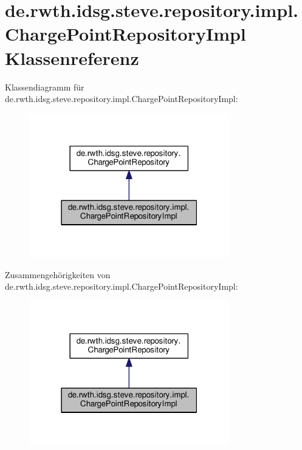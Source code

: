 \hypertarget{classde_1_1rwth_1_1idsg_1_1steve_1_1repository_1_1impl_1_1_charge_point_repository_impl}{\section{de.\+rwth.\+idsg.\+steve.\+repository.\+impl.\+Charge\+Point\+Repository\+Impl Klassenreferenz}
\label{classde_1_1rwth_1_1idsg_1_1steve_1_1repository_1_1impl_1_1_charge_point_repository_impl}
}


Klassendiagramm für de.\+rwth.\+idsg.\+steve.\+repository.\+impl.\+Charge\+Point\+Repository\+Impl\+:\nopagebreak
\begin{figure}[H]
\begin{center}
\leavevmode
\includegraphics[width=247pt]{classde_1_1rwth_1_1idsg_1_1steve_1_1repository_1_1impl_1_1_charge_point_repository_impl__inherit__graph}
\end{center}
\end{figure}


Zusammengehörigkeiten von de.\+rwth.\+idsg.\+steve.\+repository.\+impl.\+Charge\+Point\+Repository\+Impl\+:\nopagebreak
\begin{figure}[H]
\begin{center}
\leavevmode
\includegraphics[width=247pt]{classde_1_1rwth_1_1idsg_1_1steve_1_1repository_1_1impl_1_1_charge_point_repository_impl__coll__graph}
\end{center}
\end{figure}
